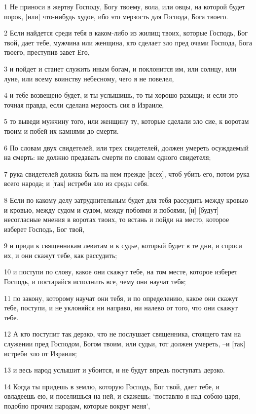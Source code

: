 \par 1 Не приноси в жертву Господу, Богу твоему, вола, или овцы, на которой будет порок, [или] что-нибудь худое, ибо это мерзость для Господа, Бога твоего.
\par 2 Если найдется среди тебя в каком-либо из жилищ твоих, которые Господь, Бог твой, дает тебе, мужчина или женщина, кто сделает зло пред очами Господа, Бога твоего, преступив завет Его,
\par 3 и пойдет и станет служить иным богам, и поклонится им, или солнцу, или луне, или всему воинству небесному, чего я не повелел,
\par 4 и тебе возвещено будет, и ты услышишь, то ты хорошо разыщи; и если это точная правда, если сделана мерзость сия в Израиле,
\par 5 то выведи мужчину того, или женщину ту, которые сделали зло сие, к воротам твоим и побей их камнями до смерти.
\par 6 По словам двух свидетелей, или трех свидетелей, должен умереть осуждаемый на смерть: не должно предавать смерти по словам одного свидетеля;
\par 7 рука свидетелей должна быть на нем прежде [всех], чтоб убить его, потом рука всего народа; и [так] истреби зло из среды себя.
\par 8 Если по какому делу затруднительным будет для тебя рассудить между кровью и кровью, между судом и судом, между побоями и побоями, [и] [будут] несогласные мнения в воротах твоих, то встань и пойди на место, которое изберет Господь, Бог твой,
\par 9 и приди к священникам левитам и к судье, который будет в те дни, и спроси их, и они скажут тебе, как рассудить;
\par 10 и поступи по слову, какое они скажут тебе, на том месте, которое изберет Господь, и постарайся исполнить все, чему они научат тебя;
\par 11 по закону, которому научат они тебя, и по определению, какое они скажут тебе, поступи, и не уклоняйся ни направо, ни налево от того, что они скажут тебе.
\par 12 А кто поступит так дерзко, что не послушает священника, стоящего там на служении пред Господом, Богом твоим, или судьи, тот должен умереть, --и [так] истреби зло от Израиля;
\par 13 и весь народ услышит и убоится, и не будут впредь поступать дерзко.
\par 14 Когда ты придешь в землю, которую Господь, Бог твой, дает тебе, и овладеешь ею, и поселишься на ней, и скажешь: `поставлю я над собою царя, подобно прочим народам, которые вокруг меня',
